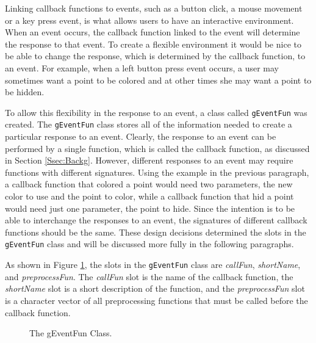 \documentclass{article}[11pt]
\newcommand{\Robject}[1]{{\texttt{#1}}}
\newcommand{\Rslot}[1]{\textsl{#1}}
\begin{document}
Linking callback functions to events, such as a button click, a mouse movement
or a key press event, is what allows users to have an interactive
environment.  When an event occurs, the callback function linked to the event
will determine the response to that event.  To create a flexible environment
it would be nice to be able to change the response, which is determined by the
callback function, to an event.  For example, when a left button press event
occurs, a user may sometimes want a point to be colored and at other times she
may want a point to be hidden.  

To allow this flexibility in the response to an event, a class called
\Robject{gEventFun} was created.  The \Robject{gEventFun} class stores all of
the information needed to create a particular response to an event.
Clearly, the response to an event can be performed by a single function,
which is called the callback function, as discussed in Section
\ref{Ssec:Backg}.  However, different responses to an event may require
functions with different signatures.  Using the example in the previous
paragraph, a callback function that colored a point would need two parameters,
the new color to use and the point to color, while a callback function that
hid a point would need just one parameter, the point to hide.  Since the
intention is to be able to interchange the responses to an event, the
signatures of different callback functions should be the same.  These design
decisions determined the slots in the \Robject{gEventFun} class and will be
discussed more fully in the following paragraphs. 

As shown in Figure \ref{Fig:EventFun}, the slots in the \Robject{gEventFun}
class are \Rslot{callFun}, \Rslot{shortName}, and \Rslot{preprocessFun}.  The
\Rslot{callFun} slot is the name of the callback function, the
\Rslot{shortName} slot is a short description of the function, and the
\Rslot{preprocessFun} slot is a character vector of all preprocessing
functions that must be called before the callback function.

\begin{figure}[ht]
  \begin{center}
    \caption{ The gEventFun Class. }
    \label{Fig:EventFun}
  \end{center}
\end{figure}
\end{document}
